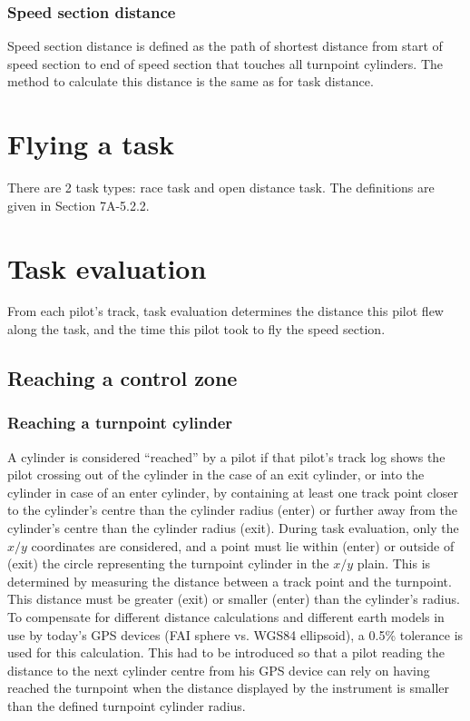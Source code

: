 \documentclass{article}
\begin{document}
\subsubsection{Speed section distance}
Speed section distance is defined as the path of shortest distance from start
of speed section to end of speed section that touches all turnpoint cylinders.
The method to calculate this distance is the same as for task distance.

\newpage
\section{Flying a task}
\label{sec:flying-a-task}
There are 2 task types: race task and open distance task. The definitions are
given in Section 7A-5.2.2.

\newpage
\section{Task evaluation}
\label{sec:task-evaluation}
From each pilot’s track, task evaluation determines the distance this pilot
flew along the task, and the time this pilot took to fly the speed section.

\subsection{Reaching a control zone}
\subsubsection{Reaching a turnpoint cylinder}
\label{sec:reaching-a-turnpoint-cylinder}
A cylinder is considered “reached” by a pilot if that pilot’s track log shows
the pilot crossing out of the cylinder in the case of an exit cylinder, or into
the cylinder in case of an enter cylinder, by containing at least one track
point closer to the cylinder’s centre than the cylinder radius (enter) or
further away from the cylinder’s centre than the cylinder radius (exit). During
task evaluation, only the \(x/y\) coordinates are considered, and a point must
lie within (enter) or outside of (exit) the circle representing the turnpoint
cylinder in the \(x/y\) plain. This is determined by measuring the distance
between a track point and the turnpoint. This distance must be greater (exit)
or smaller (enter) than the cylinder’s radius.  To compensate for different
distance calculations and different earth models in use by today’s GPS devices
(FAI sphere vs. WGS84 ellipsoid), a 0.5\% tolerance is used for this
calculation. This had to be introduced so that a pilot reading the distance to
the next cylinder centre from his GPS device can rely on having reached the
turnpoint when the distance displayed by the instrument is smaller than the
defined turnpoint cylinder radius.
\end{document}
